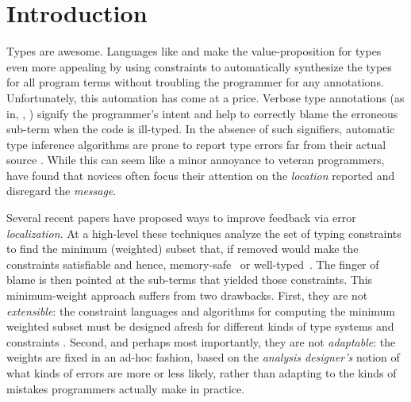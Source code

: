 \section{Introduction}
\label{sec:introduction}

%
Types are awesome.
%
Languages like \ocaml and \haskell make
the value-proposition for types even more
appealing by using constraints to automatically
synthesize the types for all program terms
without troubling the programmer for any
annotations.
%
Unfortunately, this automation has come at a price.
Verbose type annotations (as in, \eg, \java) signify
the programmer's intent and help to correctly
blame the erroneous sub-term when the code is
ill-typed.
%
In the absence of such signifiers, automatic
type inference algorithms are prone to report
type errors far from their actual source
\citep{Wand1986-nw}.
%
While this can seem like a minor annoyance to
veteran programmers, \citet{Joosten1993-yx} have found
that novices often focus their attention on the \emph{location}
reported and disregard the \emph{message}.

%
Several recent papers have proposed ways
to improve feedback via error \emph{localization}.
%
At a high-level these techniques analyze
the set of typing constraints to find
the minimum (weighted) subset that,
if removed would make the constraints
satisfiable and hence, memory-safe~\citep{Jose:2011}
or well-typed~\citep{Zhang2014-lv,Loncaric2016-uk,Chen2014-gd,Pavlinovic2014-mr}.
The finger of blame is then pointed at the
sub-terms that yielded those constraints.
%
This minimum-weight approach suffers
from two drawbacks.
%
First, they are not \emph{extensible}:
the constraint languages and algorithms for computing
the minimum weighted subset must be
designed afresh for different kinds
of type systems and constraints \citep{Loncaric2016-uk}.
%
Second, and perhaps most importantly,
they are not \emph{adaptable}: the
weights are fixed in an ad-hoc fashion, based on the
\emph{analysis designer's} notion
of what kinds of errors are more
or less likely, rather than
adapting to the kinds of mistakes
programmers actually make in practice.

